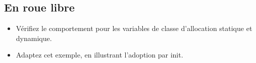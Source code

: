 \subsection{En roue libre}
\begin{itemize}
\item Vérifiez le comportement pour les variables de classe d'allocation statique et dynamique.
\item Adaptez cet exemple, en illustrant l'adoption par init.
\end{itemize}
\newpage
